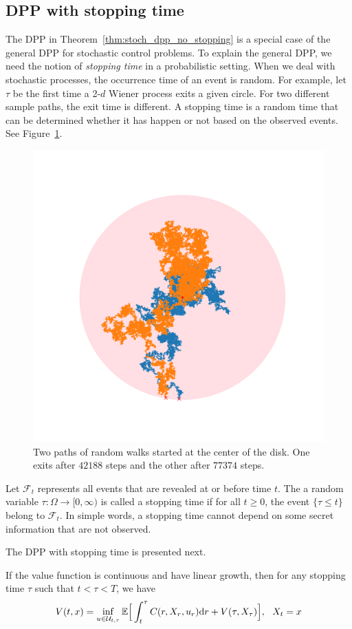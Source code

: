 \documentclass[11pt]{book}
\newcommand{\dr}{\text{\normalfont d}r}
\begin{document}
\subsection{DPP with stopping time}
The DPP in Theorem~\ref{thm:stoch_dpp_no_stopping} is a special case of the general DPP for stochastic control problems. To explain the general DPP, we need the notion of \emph{stopping time} in a probabilistic setting. When we deal with stochastic processes, the occurrence time of an event is random. For example, let $\tau$ be the first time a 2-$d$ Wiener process exits a given circle.  For two different sample paths, the exit time is different.
A stopping time is a random time that can be determined whether it has happen or not based on the observed events. See Figure~\ref{fig:exit_time}.
\begin{figure}[ht!]
    \centering
    \includegraphics[width=0.5\linewidth]{Control_lecture_notes/Figs/bm_2d_hitting_time.png}
    \caption{Two paths of random walks started at the center of the disk. One exits after $42188$ steps  and the other after $77374$ steps.}
    \label{fig:exit_time}
\end{figure}
\begin{defn}
Let $\mathcal{F}_t$ represents all events that are revealed at or before time $t$. The a random variable $\tau:\Omega\to[0,\infty)$ is called a stopping time if for all $t\ge0$, the event $\{\tau\le t\}$ belong to $\mathcal{F}_t$.
    In simple words, a stopping time cannot depend on some secret information that are not observed. 
\end{defn}
The DPP with stopping time is presented next.
\begin{thm}\label{thm:stoch_dpp_stopping}
    If the value function is continuous and have linear growth, then for any stopping time $\tau$ such that $t<\tau<T$, we have 
    \begin{equation}\label{eqn:stoch_dpp_stopping}
        V(t,x)= \inf_{u\in\mathcal{U}_{t,\tau}}\mathbb{E}\Big[\int_t^\tau C(r,X_r,u_r){\dr} + V(\tau,X_\tau)\Big],~~X_t=x
    \end{equation}
\end{thm}
\end{document}
